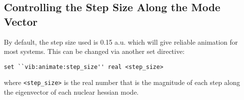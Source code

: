 \subsection{Controlling the Step Size Along the Mode Vector}
By default, the step size used is 0.15 a.u. which will give reliable
animation for most systems.  This can be changed via another set
directive:
\begin{verbatim}
set ``vib:animate:step_size'' real <step_size>
\end{verbatim}
where \verb+<step_size>+ is the real number that is the magnitude of
each step along the eigenvector of each nuclear hessian mode.
